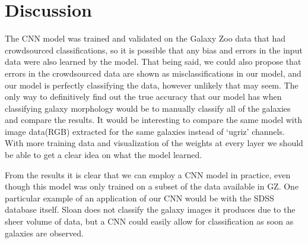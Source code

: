 \section{Discussion}
\label{sec:dis}
The CNN model was trained and validated on the Galaxy Zoo data that had crowdsourced classifications, so it is possible that any bias and errors in the input data were also learned by the model. 
That being said, we could also propose that errors in the crowdsourced data are shown as misclassifications in our model, and our model is perfectly classifying the data, however unlikely that may seem. 
The only way to definitively find out the true accuracy that our model has when classifying galaxy morphology would be to manually classify all of the galaxies and compare the results. 
It would be interesting to compare the same model with image data(RGB) extracted for the same galaxies instead of `ugriz' channels. 
With more training data and visualization of the weights at every layer we should be able to get a clear idea on what the model learned.

From the results it is clear that we can employ a CNN model in practice, even though this model was only trained on a subset of the data available in GZ.
One particular example of an application of our CNN would be with the SDSS database itself. Sloan does not classify the galaxy images it produces due to the sheer volume of data, but a CNN could easily allow for classification as soon as galaxies are observed. 


